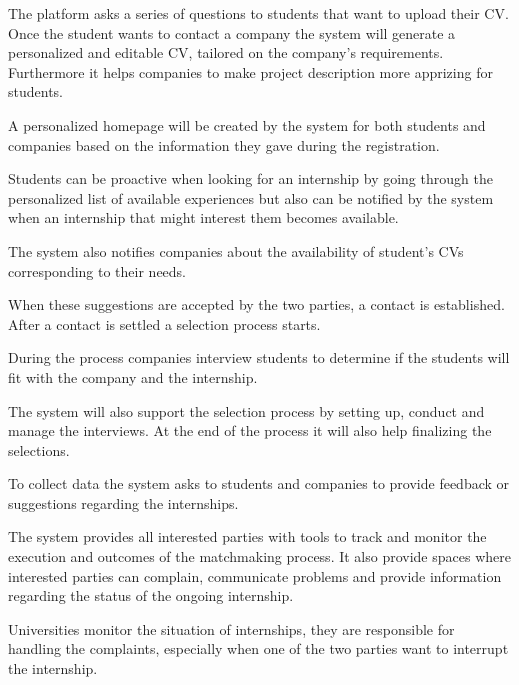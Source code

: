 The platform asks a series of questions to students that want to upload their CV. Once the student wants to contact a company the system will generate a personalized and editable CV, tailored on the company's requirements. Furthermore it helps companies to make project description more apprizing for students.

A personalized homepage will be created by the system for both students and companies based on the information they gave during the registration.

Students can be proactive when looking for an internship by going through the personalized list of available experiences but also can be notified by the system when an internship that might interest them becomes available. 

The system also notifies companies about the availability of student's CVs corresponding to their needs.

When these suggestions are accepted by the two parties, a contact is established. After a contact is settled a selection process starts.

During the process companies interview students to determine if the students will fit with the company and the internship. 

The system will also support the selection process by setting up, conduct and manage the interviews. At the end of the process it will also help finalizing the selections.

To collect data the system asks to students and companies to provide feedback or suggestions regarding the internships.

The system provides all interested parties with tools to track and monitor the execution and outcomes of the matchmaking process. It also provide spaces where interested parties can complain, communicate problems and provide information regarding the status of the ongoing internship.

Universities monitor the situation of internships, they are responsible for handling the complaints, especially when one of the two parties want to interrupt the internship.



